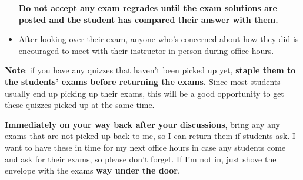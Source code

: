 \documentclass[12pt]{article}
\begin{document}
\begin{itemize}
              \textbf{Do not accept any exam regrades until the exam
              solutions are posted and the student has compared their
              answer with them.}

        \item After looking over their exam, anyone who's concerned about
              how they did is encouraged to meet with their instructor in
              person during office hours.

      \end{itemize}

      \vspace{-2.5mm}

      \textbf{Note}: if you have any quizzes that haven't been picked up yet,
    \textbf{staple them to the students' exams before returning the exams.}
    Since most students usually end up picking up their exams, this will be
    a good opportunity to get these quizzes picked up at the same time.

      \textbf{Immediately on your way back after your discussions}, bring any
    any exams that are not picked up back to me, so I can return them if
    students ask.  I want to have these in time for my next office hours in
    case any students come and ask for their exams, so please don't forget.
    If I'm not in, just shove the envelope with the exams \textbf{way under
    the door}.
\end{document}
